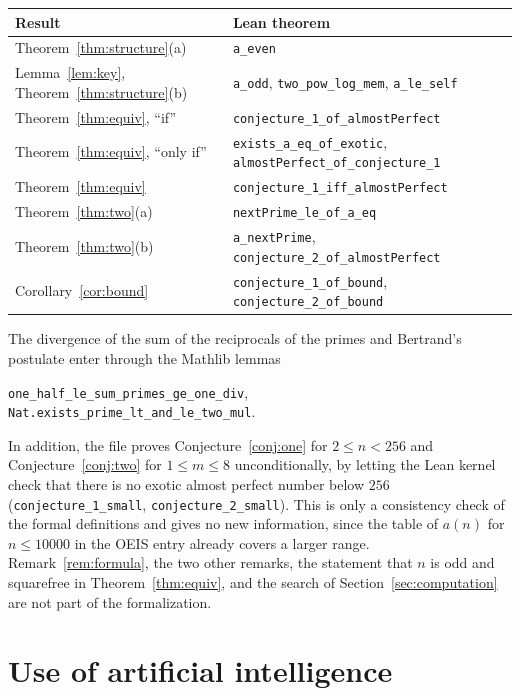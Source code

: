 \documentclass[12pt,reqno]{article}
\newcommand{\lean}[1]{\texttt{#1}}
\theoremstyle{plain}
\theoremstyle{definition}
\theoremstyle{remark}
\begin{document}
\begin{center}
\begin{tabular}{ll}
Result & Lean theorem \\ \hline
Theorem~\ref{thm:structure}(a) & \lean{a\_even} \\
Lemma~\ref{lem:key}, Theorem~\ref{thm:structure}(b) & \lean{a\_odd}, \lean{two\_pow\_log\_mem}, \lean{a\_le\_self} \\
Theorem~\ref{thm:equiv}, ``if'' & \lean{conjecture\_1\_of\_almostPerfect} \\
Theorem~\ref{thm:equiv}, ``only if'' & \lean{exists\_a\_eq\_of\_exotic}, \lean{almostPerfect\_of\_conjecture\_1} \\
Theorem~\ref{thm:equiv} & \lean{conjecture\_1\_iff\_almostPerfect} \\
Theorem~\ref{thm:two}(a) & \lean{nextPrime\_le\_of\_a\_eq} \\
Theorem~\ref{thm:two}(b) & \lean{a\_nextPrime}, \lean{conjecture\_2\_of\_almostPerfect} \\
Corollary~\ref{cor:bound} & \lean{conjecture\_1\_of\_bound}, \lean{conjecture\_2\_of\_bound} \\
\end{tabular}
\end{center}

The divergence of the sum of the reciprocals of the primes and Bertrand's
postulate enter through the Mathlib lemmas
\begin{center}
\lean{one\_half\_le\_sum\_primes\_ge\_one\_div},\\
\lean{Nat.exists\_prime\_lt\_and\_le\_two\_mul}.
\end{center}
In addition,
the file proves Conjecture~\ref{conj:one} for $2 \le n < 256$ and
Conjecture~\ref{conj:two} for $1 \le m \le 8$ unconditionally, by letting the
Lean kernel check that there is no exotic almost perfect number below $256$
(\lean{conjecture\_1\_small}, \lean{conjecture\_2\_small}). This is only a
consistency check of the formal definitions and gives no new information, since
the table of $a(n)$ for $n \le 10000$ in the OEIS entry already covers a larger
range.
Remark~\ref{rem:formula}, the two other remarks, the statement that $n$ is odd
and squarefree in Theorem~\ref{thm:equiv}, and the search of
Section~\ref{sec:computation} are not part of the formalization.

\section{Use of artificial intelligence}
\end{document}
